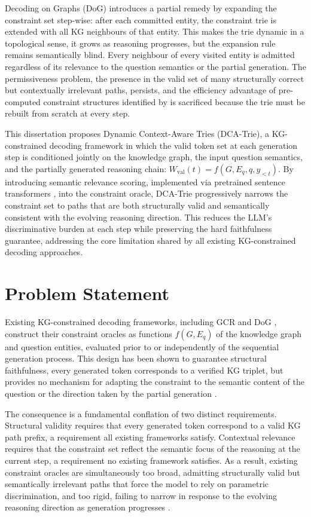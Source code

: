 Decoding on Graphs (DoG) \citep{li2024dog} introduces a partial remedy by expanding the constraint set step-wise: after each committed entity, the constraint trie is extended with all KG neighbours of that entity. This makes the trie dynamic in a topological sense, it grows as reasoning progresses, but the expansion rule remains semantically blind. Every neighbour of every visited entity is admitted regardless of its relevance to the question semantics or the partial generation. The permissiveness problem, the presence in the valid set of many structurally correct but contextually irrelevant paths, persists, and the efficiency advantage of pre-computed constraint structures identified by \citet{willard2023outlines} is sacrificed because the trie must be rebuilt from scratch at every step.

This dissertation proposes Dynamic Context-Aware Tries (DCA-Trie), a KG-constrained decoding framework in which the valid token set at each generation step is conditioned jointly on the knowledge graph, the input question semantics, and the partially generated reasoning chain: $W_{\mathrm{val}}(t) = f(G, E_q, q, y_{<t})$. By introducing semantic relevance scoring, implemented via pretrained sentence transformers \citep{reimers2019sentence}, into the constraint oracle, DCA-Trie progressively narrows the constraint set to paths that are both structurally valid and semantically consistent with the evolving reasoning direction. This reduces the LLM's discriminative burden at each step while preserving the hard faithfulness guarantee, addressing the core limitation shared by all existing KG-constrained decoding approaches.

\section{Problem Statement}

Existing KG-constrained decoding frameworks, including GCR \citep{luo2024gcr} and DoG \citep{li2024dog}, construct their constraint oracles as functions $f(G, E_q)$ of the knowledge graph and question entities, evaluated prior to or independently of the sequential generation process. This design has been shown to guarantee structural faithfulness, every generated token corresponds to a verified KG triplet, but provides no mechanism for adapting the constraint to the semantic content of the question or the direction taken by the partial generation \citep{geng2023gcd,willard2023outlines}.

The consequence is a fundamental conflation of two distinct requirements. Structural validity requires that every generated token correspond to a valid KG path prefix, a requirement all existing frameworks satisfy. Contextual relevance requires that the constraint set reflect the semantic focus of the reasoning at the current step, a requirement no existing framework satisfies. As a result, existing constraint oracles are simultaneously too broad, admitting structurally valid but semantically irrelevant paths that force the model to rely on parametric discrimination, and too rigid, failing to narrow in response to the evolving reasoning direction as generation progresses \citep{li2024dog,luo2024gcr}.


